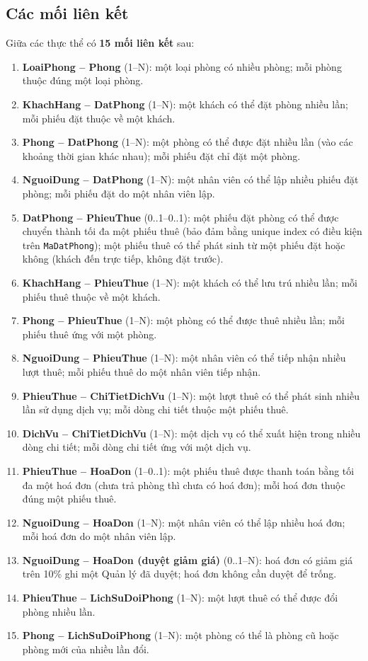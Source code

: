 \documentclass[14pt]{report}
\begin{document}
\subsection{Các mối liên kết}

Giữa các thực thể có \textbf{15 mối liên kết} sau:

\begin{enumerate}
  \item \textbf{LoaiPhong -- Phong} (1--N): một loại phòng có nhiều phòng; mỗi phòng thuộc đúng một loại phòng.
  \item \textbf{KhachHang -- DatPhong} (1--N): một khách có thể đặt phòng nhiều lần; mỗi phiếu đặt thuộc về một khách.
  \item \textbf{Phong -- DatPhong} (1--N): một phòng có thể được đặt nhiều lần (vào các khoảng thời gian khác nhau); mỗi phiếu đặt chỉ đặt một phòng.
  \item \textbf{NguoiDung -- DatPhong} (1--N): một nhân viên có thể lập nhiều phiếu đặt phòng; mỗi phiếu đặt do một nhân viên lập.
  \item \textbf{DatPhong -- PhieuThue} (0..1--0..1): một phiếu đặt phòng có thể được chuyển thành tối đa một phiếu thuê (bảo đảm bằng unique index có điều kiện trên \texttt{MaDatPhong}); một phiếu thuê có thể phát sinh từ một phiếu đặt hoặc không (khách đến trực tiếp, không đặt trước).
  \item \textbf{KhachHang -- PhieuThue} (1--N): một khách có thể lưu trú nhiều lần; mỗi phiếu thuê thuộc về một khách.
  \item \textbf{Phong -- PhieuThue} (1--N): một phòng có thể được thuê nhiều lần; mỗi phiếu thuê ứng với một phòng.
  \item \textbf{NguoiDung -- PhieuThue} (1--N): một nhân viên có thể tiếp nhận nhiều lượt thuê; mỗi phiếu thuê do một nhân viên tiếp nhận.
  \item \textbf{PhieuThue -- ChiTietDichVu} (1--N): một lượt thuê có thể phát sinh nhiều lần sử dụng dịch vụ; mỗi dòng chi tiết thuộc một phiếu thuê.
  \item \textbf{DichVu -- ChiTietDichVu} (1--N): một dịch vụ có thể xuất hiện trong nhiều dòng chi tiết; mỗi dòng chi tiết ứng với một dịch vụ.
  \item \textbf{PhieuThue -- HoaDon} (1--0..1): một phiếu thuê được thanh toán bằng tối đa một hoá đơn (chưa trả phòng thì chưa có hoá đơn); mỗi hoá đơn thuộc đúng một phiếu thuê.
  \item \textbf{NguoiDung -- HoaDon} (1--N): một nhân viên có thể lập nhiều hoá đơn; mỗi hoá đơn do một nhân viên lập.
  \item \textbf{NguoiDung -- HoaDon (duyệt giảm giá)} (0..1--N): hoá đơn có giảm giá trên 10\% ghi một Quản lý đã duyệt; hoá đơn không cần duyệt để trống.
  \item \textbf{PhieuThue -- LichSuDoiPhong} (1--N): một lượt thuê có thể được đổi phòng nhiều lần.
  \item \textbf{Phong -- LichSuDoiPhong} (1--N): một phòng có thể là phòng cũ hoặc phòng mới của nhiều lần đổi.
\end{enumerate}
\end{document}
